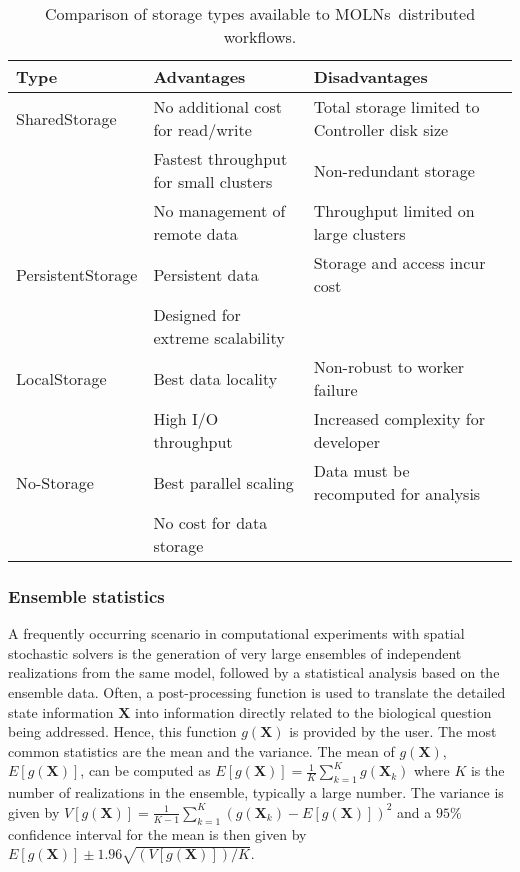 \documentclass[final,leqno,onefignum,onetabnum]{siamltex1213}
\def\packagename {MOLNs}
\begin{document}
\begin{table*}[t]
\begin{tabular}{|l|l|l|l|}
\hline
{\bf Type} & {\bf Advantages} & {\bf Disadvantages}\\
\hline
SharedStorage  &  No additional cost for read/write & Total storage limited to Controller disk size\\
& Fastest throughput for small clusters & Non-redundant storage\\
& No management of remote data & Throughput limited on large clusters \\
\hline
PersistentStorage   & Persistent data  & Storage and access incur cost\\
  &  Designed for extreme scalability  & \\
\hline
LocalStorage  & Best data locality & Non-robust to worker failure \\
  &   High I/O throughput & Increased complexity for developer\\
\hline
No-Storage  &  Best parallel scaling & Data must be recomputed for analysis\\
& No cost for data storage	& \\
\hline
\end{tabular}
\caption{Comparison of storage types available to \packagename~distributed workflows.}
\label{tab:storage}
\end{table*}

\subsubsection{Ensemble statistics}
\label{sec:statistics}
A frequently occurring scenario in computational experiments with spatial stochastic solvers is the generation of very large ensembles of independent realizations from the same model, followed by a statistical analysis based on the ensemble data. Often, a post-processing function is used to translate the detailed state information $\mathbf{X}$ into information directly related to the biological question being addressed. Hence, this function $g(\mathbf{X})$ is provided by the user. The most common statistics are the mean and the variance. The mean of $g(\mathbf{X})$, $E[g(\mathbf{X})]$, can be computed as 
$E[g(\mathbf{X})] = {\frac{1}{K}}\sum_{k=1}^{K} g(\mathbf{X}_k) $
where $K$ is the number of realizations in the ensemble, typically a large number. The variance is given by 
$V[g(\mathbf{X})] = {\frac{1}{K-1}}\sum_{k=1}^{K} (g(\mathbf{X}_k) - E[g(\mathbf{X})])^2$
and a $95\%$ confidence interval for the mean is then given by 
$E[g(\mathbf{X})] \pm 1.96\sqrt{(V[g(\mathbf{X})])/K}$.
\end{document}
